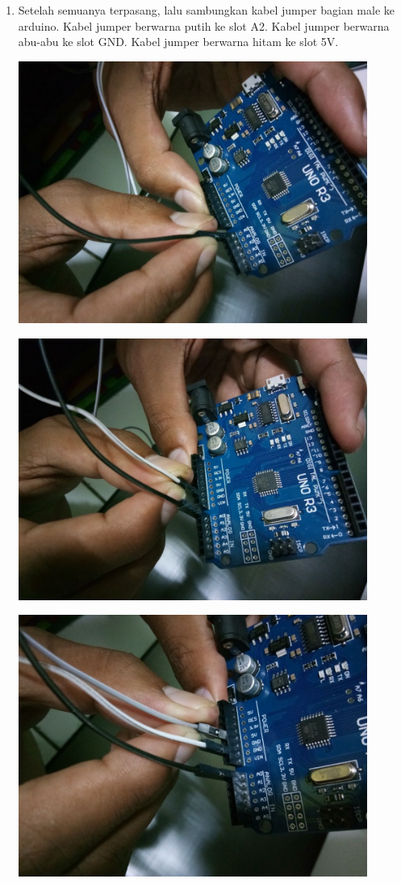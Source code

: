 \begin{enumerate}
\item Setelah semuanya terpasang, lalu sambungkan kabel jumper bagian male ke arduino. Kabel jumper berwarna putih ke slot A2. Kabel jumper berwarna abu-abu ke slot GND. Kabel jumper berwarna hitam ke slot 5V.
\break
\centerline{\includegraphics[width=0.9\textwidth]{figures/ss1.jpeg}}
\break
\centerline{\includegraphics[width=0.9\textwidth]{figures/ss2.jpeg}}
\break
\centerline{\includegraphics[width=0.9\textwidth]{figures/ss3.jpeg}}

\end{enumerate}
